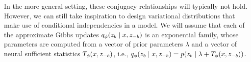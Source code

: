 \documentclass[anonymous=false, %
               format=acmsmall, %
               review=true, %
               screen=true, %
               nonacm=true]{acmart}
\theoremstyle{definition}
\begin{document}
In the more general setting, these conjugacy relationships will typically not hold. However, we can still take inspiration to design variational distributions that make use of conditional independencies in a model. We will assume that each of the approximate Gibbs updates $q_\phi(z_b \mid x, z_{-b})$ is an exponential family, whose parameters are computed from a vector of prior parameters $\lambda$ and a vector of neural sufficient statistics $T_\phi(x, z_{-b})$, i.e., $q_\phi(z_b \mid x, z_{-b}) = p(z_b \mid \lambda + T_\phi(x, z_{-b}))$.
\end{document}
